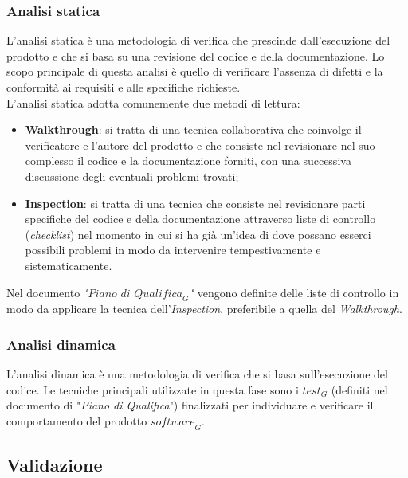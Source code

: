 \subsubsection{Analisi statica}
L'analisi statica è una metodologia di verifica che prescinde dall'esecuzione del prodotto e che si basa su una revisione del codice e della documentazione. Lo scopo principale di questa analisi è quello di verificare l'assenza di difetti e la conformità ai requisiti e alle specifiche richieste. \\
L'analisi statica adotta comunemente due metodi di lettura:
\begin{itemize}
    \item \textbf{Walkthrough}: si tratta di una tecnica collaborativa che coinvolge il verificatore e l'autore del prodotto e che consiste nel revisionare nel suo complesso il codice e la documentazione forniti, con una successiva discussione degli eventuali problemi trovati;
    \item \textbf{Inspection}: si tratta di una tecnica che consiste nel revisionare parti specifiche del codice e della documentazione attraverso liste di controllo (\emph{checklist}) nel momento in cui si ha già un'idea di dove possano esserci possibili problemi in modo da intervenire tempestivamente e sistematicamente.
\end{itemize}
Nel documento \emph{"$\textit{Piano di Qualifica}_G$"} vengono definite delle liste di controllo in modo da applicare la tecnica dell'\textit{Inspection}, preferibile a quella del \textit{Walkthrough}.
\subsubsection{Analisi dinamica}
L'analisi dinamica è una metodologia di verifica che si basa sull'esecuzione del codice. Le tecniche principali utilizzate in questa fase sono i $\textit{test}_G$ (definiti nel documento di "\emph{Piano di Qualifica}") finalizzati per individuare e verificare il comportamento del prodotto $\textit{software}_G$.

\subsection{Validazione}

